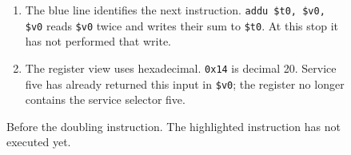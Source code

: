 \begin{figure}[htbp]
  \par\smallskip
  \begin{minipage}{\linewidth}
    \small
    \begin{enumerate}
      \item The blue line identifies the next instruction. \texttt{addu \$t0, \$v0, \$v0} reads \texttt{\$v0} twice and writes their sum to \texttt{\$t0}. At this stop it has not performed that write.
      \item The register view uses hexadecimal. \texttt{0x14} is decimal 20. Service five has already returned this input in \texttt{\$v0}; the register no longer contains the service selector five.
    \end{enumerate}
  \end{minipage}
  \caption{Before the doubling instruction. The highlighted instruction has not executed yet.}
  \label{capture:001-console-calculation-f03-before-add}
\end{figure}
